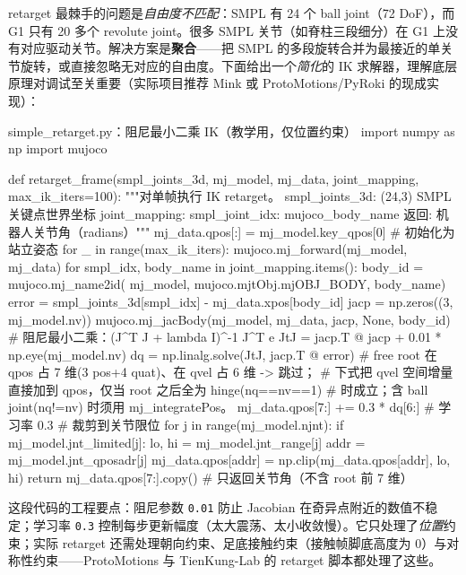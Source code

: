 retarget 最棘手的问题是\emph{自由度不匹配}：SMPL 有 24 个 ball joint（72 DoF），而 G1 只有 20 多个 revolute joint。很多 SMPL 关节（如脊柱三段细分）在 G1 上没有对应驱动关节。解决方案是\textbf{聚合}——把 SMPL 的多段旋转合并为最接近的单关节旋转，或直接忽略无对应的自由度。下面给出一个\emph{简化}的 IK 求解器，理解底层原理对调试至关重要（实际项目推荐 Mink 或 ProtoMotions/PyRoki 的现成实现）：

\begin{codebox}[Python]{simple\_retarget.py：阻尼最小二乘 IK（教学用，仅位置约束）}
import numpy as np
import mujoco

def retarget_frame(smpl_joints_3d, mj_model, mj_data,
                   joint_mapping, max_ik_iters=100):
    """对单帧执行 IK retarget。
    smpl_joints_3d: (24,3) SMPL 关键点世界坐标
    joint_mapping:  {smpl_joint_idx: mujoco_body_name}
    返回: 机器人关节角（radians）"""
    mj_data.qpos[:] = mj_model.key_qpos[0]          # 初始化为站立姿态
    for _ in range(max_ik_iters):
        mujoco.mj_forward(mj_model, mj_data)
        for smpl_idx, body_name in joint_mapping.items():
            body_id = mujoco.mj_name2id(
                mj_model, mujoco.mjtObj.mjOBJ_BODY, body_name)
            error = smpl_joints_3d[smpl_idx] - mj_data.xpos[body_id]
            jacp = np.zeros((3, mj_model.nv))
            mujoco.mj_jacBody(mj_model, mj_data, jacp, None, body_id)
            # 阻尼最小二乘：(J^T J + lambda I)^-1 J^T e
            JtJ = jacp.T @ jacp + 0.01 * np.eye(mj_model.nv)
            dq = np.linalg.solve(JtJ, jacp.T @ error)
            # free root 在 qpos 占 7 维(3 pos+4 quat)、在 qvel 占 6 维 -> 跳过；
            # 下式把 qvel 空间增量直接加到 qpos，仅当 root 之后全为 hinge(nq==nv==1)
            # 时成立；含 ball joint(nq!=nv) 时须用 mj_integratePos。
            mj_data.qpos[7:] += 0.3 * dq[6:]        # 学习率 0.3
        # 裁剪到关节限位
        for j in range(mj_model.njnt):
            if mj_model.jnt_limited[j]:
                lo, hi = mj_model.jnt_range[j]
                addr = mj_model.jnt_qposadr[j]
                mj_data.qpos[addr] = np.clip(mj_data.qpos[addr], lo, hi)
    return mj_data.qpos[7:].copy()                  # 只返回关节角（不含 root 前 7 维）
\end{codebox}

这段代码的工程要点：阻尼参数 \texttt{0.01} 防止 Jacobian 在奇异点附近的数值不稳定；学习率 \texttt{0.3} 控制每步更新幅度（太大震荡、太小收敛慢）。它只处理了\emph{位置}约束；实际 retarget 还需处理朝向约束、足底接触约束（接触帧脚底高度为 0）与对称性约束——ProtoMotions 与 TienKung-Lab 的 retarget 脚本都处理了这些。

